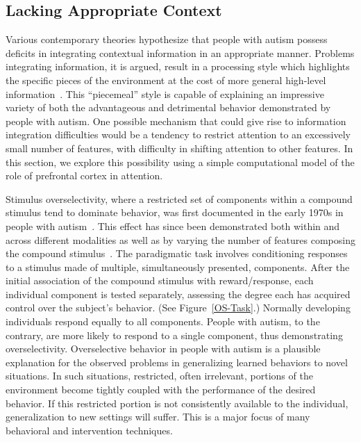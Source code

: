 %
%

\subsection{Lacking Appropriate Context}
Various contemporary theories hypothesize that people with autism possess deficits in integrating contextual information in an appropriate manner.  Problems integrating information, it is argued, result in a processing style which highlights the specific pieces of the environment at the cost of more general high-level information~\cite{HappeF:1999:WCC}. This ``piecemeal'' style is capable of explaining an impressive variety of both the advantageous and detrimental behavior demonstrated by people with autism.  One possible mechanism that could give rise to information integration difficulties would be a tendency to restrict attention to an excessively small number of features, with difficulty in shifting attention to other features.  In this section, we explore this possibility using a simple computational model of the role of prefrontal cortex in attention.

Stimulus overselectivity, where a restricted set of components within a compound stimulus tend to dominate behavior, was first documented in the early 1970s in people with autism~\cite{LovaasO:1971:Selective}.  This effect has since been demonstrated both within and across different modalities as well as by varying the number of features composing the compound stimulus~\cite{ReedP:2005:TaskLoad}.  The paradigmatic task involves conditioning responses to a stimulus made of multiple, simultaneously presented, components.  After the initial association of the compound stimulus with reward/response, each individual component is tested separately, assessing the degree each has acquired control over the subject's behavior. (See Figure~\ref{OS-Task}.)  Normally developing individuals respond equally to all components.  People with autism, to the contrary, are more likely to respond to a single component, thus demonstrating overselectivity.  Overselective behavior in people with autism is a plausible explanation for the observed problems in generalizing learned behaviors to novel situations.  In such situations, restricted, often irrelevant, portions of the environment become tightly coupled with the performance of the desired behavior.  If this restricted portion is not consistently available to the individual, generalization to new settings will suffer.  This is a major focus of many behavioral and intervention techniques. 

